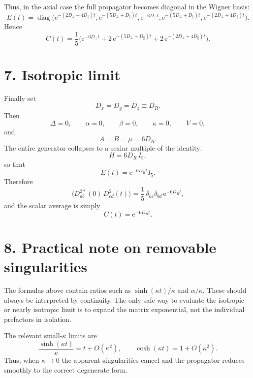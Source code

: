\documentclass[11pt]{article}
\newcommand{\e}{\mathrm{e}}
\begin{document}
Thus, in the axial case the full propagator becomes diagonal in the Wigner basis:
\begin{equation}
E(t)=\operatorname{diag}\!
\Big(
\e^{-(2D_\perp+4D_\parallel)t},
\e^{-(5D_\perp+D_\parallel)t},
\e^{-6D_\perp t},
\e^{-(5D_\perp+D_\parallel)t},
\e^{-(2D_\perp+4D_\parallel)t}
\Big).
\end{equation}
Hence
\begin{equation}
\boxed{
C(t)=\frac15\Big(
\e^{-6D_\perp t}
+2\,\e^{-(5D_\perp+D_\parallel)t}
+2\,\e^{-(2D_\perp+4D_\parallel)t}
\Big).
}
\end{equation}

\section*{7. Isotropic limit}

Finally set
\begin{equation}
D_x=D_y=D_z\equiv D_R.
\end{equation}
Then
\begin{equation}
\Delta=0,\qquad \alpha=0,\qquad \beta=0,\qquad \kappa=0,\qquad V=0,
\end{equation}
and
\begin{equation}
A=B=\mu=6D_R.
\end{equation}
The entire generator collapses to a scalar multiple of the identity:
\begin{equation}
H=6D_R\,I_5,
\end{equation}
so that
\begin{equation}
E(t)=\e^{-6D_R t}I_5.
\end{equation}
Therefore
\begin{equation}
\boxed{
\big\langle D^{2*}_{ab}(0)\,D^2_{cd}(t)\big\rangle
=
\frac15\,\delta_{ac}\delta_{bd}\,\e^{-6D_R t},
}
\end{equation}
and the scalar average is simply
\begin{equation}
\boxed{C(t)=\e^{-6D_R t}.}
\end{equation}

\section*{8. Practical note on removable singularities}

The formulas above contain ratios such as $\sinh(\kappa t)/\kappa$ and $\alpha/\kappa$.  These should always be interpreted by continuity.  The only safe way to evaluate the isotropic or nearly isotropic limit is to expand the matrix exponential, not the individual prefactors in isolation.

The relevant small-$\kappa$ limits are
\begin{equation}
\frac{\sinh(\kappa t)}{\kappa}=t+O(\kappa^2),
\qquad
\cosh(\kappa t)=1+O(\kappa^2).
\end{equation}
Thus, when $\kappa\to0$ the apparent singularities cancel and the propagator reduces smoothly to the correct degenerate form.
\end{document}
